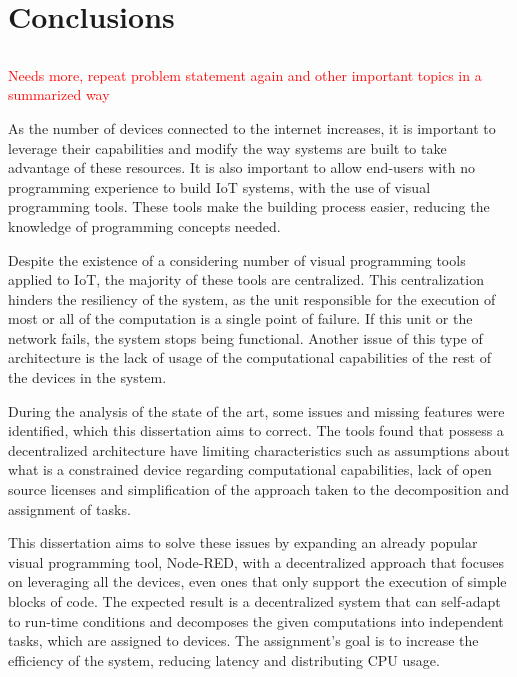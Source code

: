 \chapter{Conclusions} \label{chap:concl}

\section*{}

\textcolor{red}{Needs more, repeat problem statement again and other important topics in a summarized way}

As the number of devices connected to the internet increases, it is important to leverage their capabilities and modify the way systems are built to take advantage of these resources. It is also important to allow end-users with no programming experience to build IoT systems, with the use of visual programming tools. These tools make the building process easier, reducing the knowledge of programming concepts needed.

Despite the existence of a considering number of visual programming tools applied to IoT, the majority of these tools are centralized. This centralization hinders the resiliency of the system, as the unit responsible for the execution of most or all of the computation is a single point of failure. If this unit or the network fails, the system stops being functional. Another issue of this type of architecture is the lack of usage of the computational capabilities of the rest of the devices in the system.

During the analysis of the state of the art, some issues and missing features were identified, which this dissertation aims to correct. The tools found that possess a decentralized architecture have limiting characteristics such as assumptions about what is a constrained device regarding computational capabilities, lack of open source licenses and simplification of the approach taken to the decomposition and assignment of tasks.

This dissertation aims to solve these issues by expanding an already popular visual programming tool, Node-RED, with a decentralized approach that focuses on leveraging all the devices, even ones that only support the execution of simple blocks of code. The expected result is a decentralized system that can self-adapt to run-time conditions and decomposes the given computations into independent tasks, which are assigned to devices. The assignment's goal is to increase the efficiency of the system, reducing latency and distributing CPU usage.  





